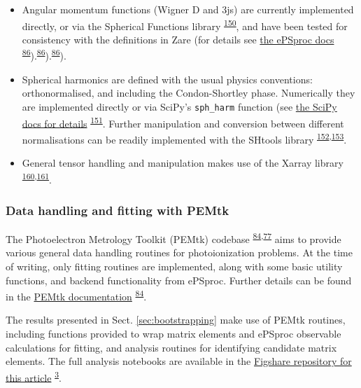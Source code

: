 \documentclass[10pt]{article}
\begin{document}
\begin{itemize}
\item Angular momentum functions (Wigner D and 3js) are currently implemented directly, or via the Spherical Functions library \textsuperscript{\hyperref[csl:150]{150}}, and have been tested for consistency with the definitions in Zare (for details see \href{https://epsproc.readthedocs.io/en/latest/tests/Spherical_function_testing_Aug_2019.html}{the ePSproc docs} \textsuperscript{\hyperref[csl:86]{86}}).\textsuperscript{\hyperref[csl:86]{86}}).\textsuperscript{\hyperref[csl:86]{86}}).
\item Spherical harmonics are defined with the usual physics conventions: orthonormalised, and including the Condon-Shortley phase. Numerically they are implemented directly or via SciPy's \verb+sph_harm+  function (see \href{https://docs.scipy.org/doc/scipy/reference/generated/scipy.special.sph_harm.html}{the SciPy docs for details} \textsuperscript{\hyperref[csl:151]{151}}. Further manipulation and conversion between different normalisations can be readily implemented with the SHtools library \textsuperscript{\hyperref[csl:152]{152},\hyperref[csl:153]{153}}.
\item General tensor handling and manipulation makes use of the Xarray library \textsuperscript{\hyperref[csl:160]{160},\hyperref[csl:161]{161}}.
\end{itemize}


\subsubsection{Data handling and fitting with PEMtk}

The Photoelectron Metrology Toolkit (PEMtk) codebase \textsuperscript{\hyperref[csl:84]{84},\hyperref[csl:77]{77}} aims to provide various general data handling routines for photoionization problems. At the time of writing, only fitting routines are implemented, along with some basic utility functions, and backend functionality from ePSproc. Further details can be found in the \href{https://pemtk.readthedocs.io/en/latest/about.html}{PEMtk documentation} \textsuperscript{\hyperref[csl:84]{84}}.

The results presented in Sect. \ref{sec:bootstrapping} make use of PEMtk routines, including functions provided to wrap matrix elements and ePSproc observable calculations for fitting, and analysis routines for identifying candidate matrix elements. The full analysis notebooks are available in the \href{http://dx.doi.org/10.6084/m9.figshare.20293782}{Figshare repository for this article} \textsuperscript{\hyperref[csl:3]{3}}.
\end{document}
